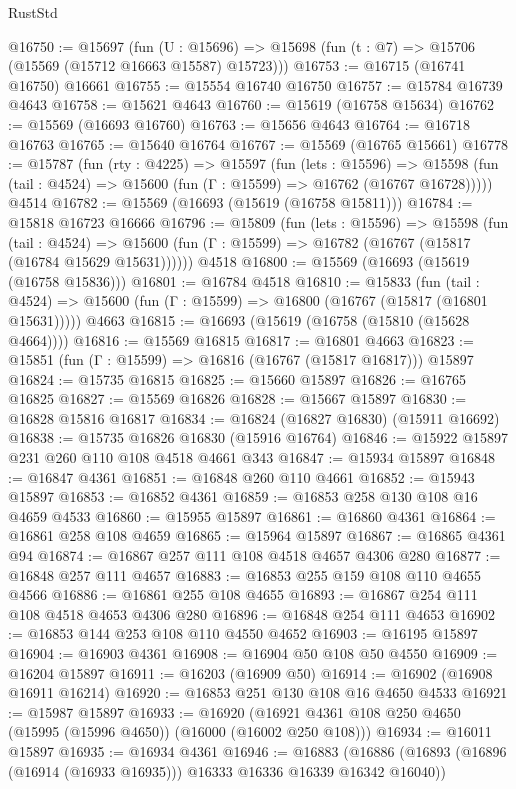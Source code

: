 \begin{lexlean}{RustStd}
\begin{coremodule}
@16750 := @15697
    (fun (U : @15696) => @15698 (fun (t : @7) => @15706 (@15569 (@15712 @16663 @15587) @15723)))
@16753 := @16715 (@16741 @16750) @16661
@16755 := @15554 @16740 @16750
@16757 := @15784 @16739 @4643
@16758 := @15621 @4643
@16760 := @15619 (@16758 @15634)
@16762 := @15569 (@16693 @16760)
@16763 := @15656 @4643
@16764 := @16718 @16763
@16765 := @15640 @16764
@16767 := @15569 (@16765 @15661)
@16778 := @15787
    (fun (rty : @4225) =>
    @15597
      (fun (lets : @15596) =>
      @15598 (fun (tail : @4524) => @15600 (fun (Γ : @15599) => @16762 (@16767 @16728)))))
    @4514
@16782 := @15569 (@16693 (@15619 (@16758 @15811)))
@16784 := @15818 @16723 @16666
@16796 := @15809
    (fun (lets : @15596) =>
    @15598
      (fun (tail : @4524) =>
      @15600 (fun (Γ : @15599) => @16782 (@16767 (@15817 (@16784 @15629 @15631))))))
    @4518
@16800 := @15569 (@16693 (@15619 (@16758 @15836)))
@16801 := @16784 @4518
@16810 := @15833
    (fun (tail : @4524) => @15600 (fun (Γ : @15599) => @16800 (@16767 (@15817 (@16801 @15631)))))
    @4663
@16815 := @16693 (@15619 (@16758 (@15810 (@15628 @4664))))
@16816 := @15569 @16815
@16817 := @16801 @4663
@16823 := @15851 (fun (Γ : @15599) => @16816 (@16767 (@15817 @16817))) @15897
@16824 := @15735 @16815
@16825 := @15660 @15897
@16826 := @16765 @16825
@16827 := @15569 @16826
@16828 := @15667 @15897
@16830 := @16828 @15816 @16817
@16834 := @16824 (@16827 @16830) (@15911 @16692)
@16838 := @15735 @16826 @16830 (@15916 @16764)
@16846 := @15922 @15897 @231 @260 @110 @108 @4518 @4661 @343
@16847 := @15934 @15897
@16848 := @16847 @4361
@16851 := @16848 @260 @110 @4661
@16852 := @15943 @15897
@16853 := @16852 @4361
@16859 := @16853 @258 @130 @108 @16 @4659 @4533
@16860 := @15955 @15897
@16861 := @16860 @4361
@16864 := @16861 @258 @108 @4659
@16865 := @15964 @15897
@16867 := @16865 @4361 @94
@16874 := @16867 @257 @111 @108 @4518 @4657 @4306 @280
@16877 := @16848 @257 @111 @4657
@16883 := @16853 @255 @159 @108 @110 @4655 @4566
@16886 := @16861 @255 @108 @4655
@16893 := @16867 @254 @111 @108 @4518 @4653 @4306 @280
@16896 := @16848 @254 @111 @4653
@16902 := @16853 @144 @253 @108 @110 @4550 @4652
@16903 := @16195 @15897
@16904 := @16903 @4361
@16908 := @16904 @50 @108 @50 @4550
@16909 := @16204 @15897
@16911 := @16203 (@16909 @50)
@16914 := @16902 (@16908 @16911 @16214)
@16920 := @16853 @251 @130 @108 @16 @4650 @4533
@16921 := @15987 @15897
@16933 := @16920 (@16921 @4361 @108 @250 @4650 (@15995 (@15996 @4650)) (@16000 (@16002 @250 @108)))
@16934 := @16011 @15897
@16935 := @16934 @4361
@16946 := @16883
    (@16886 (@16893 (@16896 (@16914 (@16933 @16935))) @16333 @16336 @16339 @16342 @16040))

\end{coremodule}
\end{lexlean}
